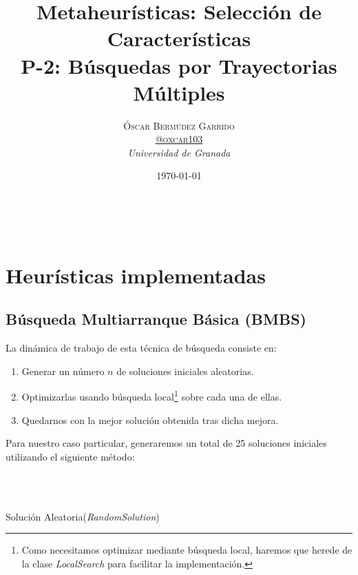 \documentclass[a4paper, 11pt]{article}
\title{\textbf{Metaheurísticas: Selección de Características}\\ %
P-2: Búsquedas por Trayectorias Múltiples} %
\author{\textsc{Óscar Bermúdez Garrido\\
\href{http://www.github.com/oxcar103}{@oxcar103}} %
\\{\textit{Universidad de Granada}}} %
\date{\today} %
\makeatletter
\renewcommand{\maketitle}{
  \begin{flushright} %
  {\LARGE\@title} %
  
  \vspace{50pt} %
  
  {\large\@author} %
  \\\@date %
  \vspace{40pt} %
  \end{flushright}
}
\makeatother
\begin{document}
\maketitle %

\renewcommand{\abstractname}{Resumen} %



{\parskip=2pt
  \tableofcontents
}
\pagebreak

	
	
	
	\section{Heurísticas implementadas}
		\subsection{Búsqueda Multiarranque Básica (\textbf{BMBS})}
			La dinámica de trabajo de esta técnica de búsqueda consiste en:
			\begin{enumerate}
				\item Generar un número $n$ de soluciones iniciales aleatorias.
				\item Optimizarlas usando búsqueda local\footnote{Como necesitamos optimizar mediante
				búsqueda local, haremos que herede de la clase \textit{LocalSearch} para facilitar
				la implementación.} sobre cada una de ellas.
				\item Quedarnos con la mejor solución obtenida tras dicha mejora.
			\end{enumerate}
			
			Para nuestro caso particular, generaremos un total de 25 soluciones iniciales utilizando
			el siguiente método:
			
			\begin{algorithm}[H]
				\begin{algorithmic}[1]
				\REQUIRE \ \\
						 \
					\ENDIF
				\ENDFOR
				\end{algorithmic}
			\caption{Solución Aleatoria(\textit{RandomSolution})}
			\label{RandomSolution}
			\end{algorithm}
			
\end{document}
